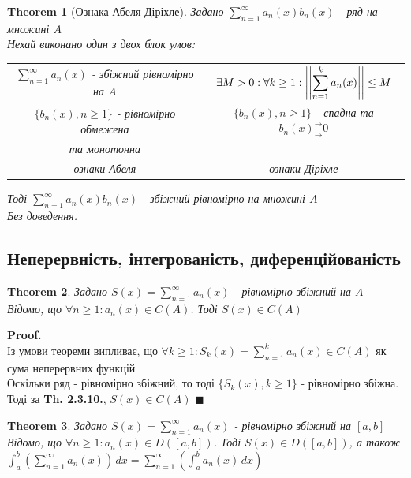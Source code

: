 \documentclass[a4paper, 14pt]{extarticle}
\def\huge{\displaystyle}
\theoremstyle{theoremdd}
\newtheorem{theorem}{Theorem}[subsection]
\theoremstyle{theoremdd}
\theoremstyle{theoremdd}
\theoremstyle{theoremdd}
\theoremstyle{theoremdd}
\theoremstyle{theoremdd}
\theoremstyle{theoremdd}
\theoremstyle{theoremdd}
\newenvironment{pf}{\vspace*{-3mm} \textbf{Proof. \\}}{$\blacksquare$}
\begin{document}
\begin{theorem}[Ознака Абеля-Діріхле]
Задано  $\huge \sum_{n=1}^\infty a_n(x) b_n(x)$ - ряд на множині $A$\\
Нехай виконано один з двох блок умов:\\
\begin{tabular}{c | c}
$\huge \sum_{n=1}^{\infty} a_n(x)$ - збіжний рівномірно на $A$ & $\exists M > 0: \forall k \geq 1: \huge \abs{\abs{\sum_{n=1}^k a_n(x)}} \leq M$ \\
$\{b_n(x), n \geq 1\}$ - рівномірно обмежена & $\{b_n(x), n \geq 1\}$ - спадна та $b_n(x)^\rightarrow_\rightarrow 0$ \\
та монотонна & \\
\textit{ознаки Абеля} & \textit{ознаки Діріхле}
\end{tabular}
Тоді $\huge \sum_{n=1}^{\infty} a_n(x) b_n(x)$ - збіжний рівномірно на множині $A$\\
\textit{Без доведення.}
\\
\end{theorem}

\subsection{Неперервність, інтегрованість, диференційованість}
\begin{theorem}
Задано $S(x) = \huge \sum_{n=1}^\infty a_n(x)$ - рівномірно збіжний на $A$\\
Відомо, що $\forall n \geq 1: a_n(x) \in C(A)$. Тоді $S(x) \in C(A)$
\end{theorem}

\begin{pf}
Із умови теореми випливає, що $\forall k \geq 1: S_k(x) = \huge \sum_{n=1}^k a_n(x) \in C(A)$ як сума неперервних функцій\\
Оскільки ряд - рівномірно збіжний, то тоді $\{S_k(x), k \geq 1\}$ - рівномірно збіжна. Тоді за \textbf{Th. 2.3.10.}, $S(x) \in C(A)$
\end{pf}

\begin{theorem}
Задано $S(x) = \huge \sum_{n=1}^\infty a_n(x)$ - рівномірно збіжний на $[a,b]$\\
Відомо, що $\forall n \geq 1: a_n(x) \in D([a,b])$. Тоді $S(x) \in D([a,b])$, а також\\
$\huge \int_a^b \left( \sum_{n=1}^\infty a_n(x) \right) \,dx = \sum_{n=1}^\infty \left( \int_a^b a_n(x)\,dx \right)$
\end{theorem}
\end{document}
